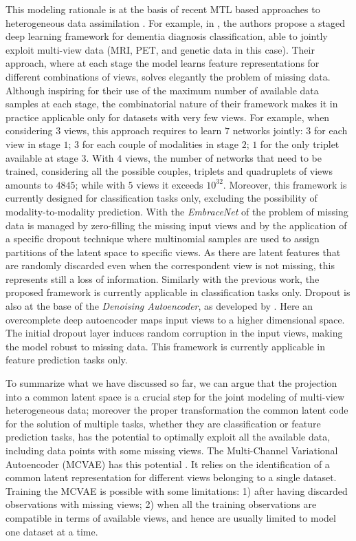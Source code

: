 This modeling rationale is at the basis of recent MTL based approaches to heterogeneous data assimilation \citep{Wu2018, Shi2019}.
For example, in \cite{Zhou2019a}, the authors propose a staged deep learning framework for dementia diagnosis classification,
able to jointly exploit multi-view data (MRI, PET, and genetic data in this case).
Their approach, where at each stage the model learns feature representations for different combinations of views, solves elegantly the problem of missing data.
Although inspiring for their use of the maximum number of available data samples at each stage,
the combinatorial nature of their framework makes it in practice applicable only for datasets with very few views.
For example, when considering $3$ views, this approach requires to learn $7$ networks jointly:
$3$ for each view in stage $1$;
$3$ for each couple of modalities in stage $2$;
$1$ for the only triplet available at stage $3$.
With $4$ views, the number of networks that need to be trained, considering all the possible couples, triplets and quadruplets of views amounts to $4845$;
while with $5$ views it exceeds $10^{32}$.
Moreover, this framework is currently designed for classification tasks only, excluding the possibility of modality-to-modality prediction.
With the \textit{EmbraceNet} of \cite{embracenet} the problem of missing data is managed by zero-filling the missing input views and by the application of a specific dropout technique where multinomial samples are used to assign partitions of the latent space to specific views.
As there are latent features that are randomly discarded even when the correspondent view is not missing, this represents still a loss of information.
Similarly with the previous work, the proposed framework is currently applicable in classification tasks only.
Dropout is also at the base of the \textit{Denoising Autoencoder}, as developed by \cite{dae}.
Here an overcomplete deep autoencoder maps input views to a higher dimensional space.
The initial dropout layer induces random corruption in the input views, making the model robust to missing data.
This framework is currently applicable in feature prediction tasks only.

To summarize what we have discussed so far,
we can argue that the projection into a common latent space is a crucial step for the joint modeling of multi-view heterogeneous data;
moreover the proper transformation the common latent code for the solution of multiple tasks, whether they are classification or feature prediction tasks,
has the potential to optimally exploit all the available data, including data points with some missing views.
%
The Multi-Channel Variational Autoencoder (MCVAE) \citep{Antelmi2019} has this potential .
It relies on the identification of a common latent representation for different views belonging to a single dataset.
Training the MCVAE is possible with some limitations:
1) after having discarded observations with missing views;
2) when all the training observations are compatible in terms of available views, and hence are usually limited to model one dataset at a time.

